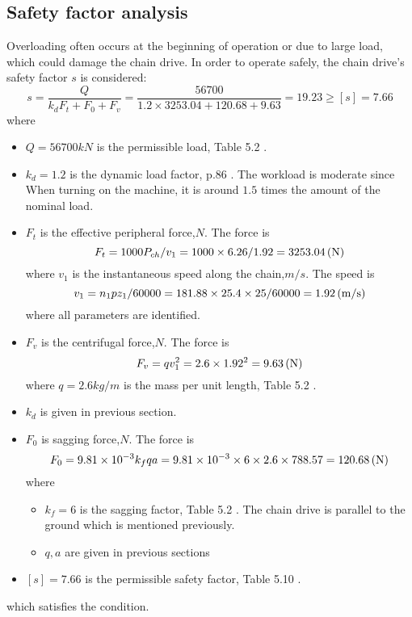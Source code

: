\subsection{Safety factor analysis}
Overloading often occurs at the beginning of operation or due to large load, which could damage the chain drive. In order to operate safely, the chain drive's safety factor $ s $ is considered:
\[s = \dfrac{Q}{k_dF_t+F_0+F_v} = \dfrac{56700}{1.2\times 3253.04+120.68+9.63}=19.23 \geq [s] = 7.66\]
where
\begin{itemize}
	\item $ Q = 56700\unit{kN}$ is the permissible load, Table 5.2 \cite{tk1}.
	\item $ k_d=1.2 $ is the dynamic load factor, p.86 \cite{tk1}. The workload is moderate since When turning on the machine, it is around $ 1.5 $ times the amount of the nominal load.
	\item $ F_t $ is the effective peripheral force,$ \unit{N} $. The force is
	\[	F_t = {1000P_{ch}}/{v_1} = {1000\times 6.26}/{1.92} = 3253.04 \, (\mathrm{N})\]
	where $ v_1 $ is the instantaneous speed along the chain,$ \unit{m/s} $. The speed is
	\[ v_1={n_1pz_1}/{60000}= {181.88\times 25.4 \times 25}/{60000} = 1.92 \, (\mathrm{m/s}) \]
	where all parameters are identified.
	\item $ F_v $ is the centrifugal force,$ \unit{N} $. The force is
	\[	F_v =qv_1^2= 2.6\times 1.92^2 = 9.63 \, (\mathrm{N})\]
	where $ q=2.6\unit{kg/m} $ is the mass per unit length, Table 5.2 \cite{tk1}.
	\item $ k_d $ is given in previous section.
	\item $ F_0 $ is sagging force,$ \unit{N} $. The force is
	\[	F_0 =9.81\times10^{-3}k_fqa = 9.81\times10^{-3}\times 6\times 2.6\times 788.57 = 120.68\, (\mathrm{N})\]
	where
	\begin{itemize}
		\item $ k_f = 6 $ is the sagging factor, Table 5.2 \cite{tk1}. The chain drive is parallel to the ground which is mentioned previously.
		\item $ q,a $ are given in previous sections
	\end{itemize}
	\item $ [s]=7.66 $ is the permissible safety factor, Table 5.10 \cite{tk1}.
\end{itemize}
which satisfies the condition.

